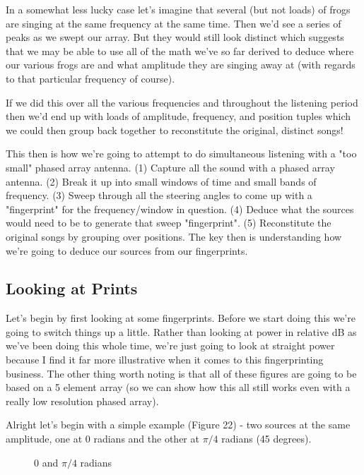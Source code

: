 \documentclass[10pt,a4paper]{article}
\begin{document}
In a somewhat less lucky case let's imagine that several (but not loads) of frogs are singing at the same frequency at the same time. Then we'd see a series of peaks as we swept our array. But they would still look distinct which suggests that we may be able to use all of the math we've so far derived to deduce where our various frogs are and what amplitude they are singing away at (with regards to that particular frequency of course). 

If we did this over all the various frequencies and throughout the listening period then we'd end up with loads of amplitude, frequency, and position tuples which we could then group back together to reconstitute the original, distinct songs! 

This then is how we're going to attempt to do simultaneous listening with a "too small" phased array antenna. (1) Capture all the sound with a phased array antenna. (2) Break it up into small windows of time and small bands of frequency. (3) Sweep through all the steering angles to come up with a "fingerprint" for the frequency/window in question. (4) Deduce what the sources would need to be to generate that sweep "fingerprint". (5) Reconstitute the original songs by grouping over positions. The key then is understanding how we're going to deduce our sources from our fingerprints.

\subsection{Looking at Prints}
Let's begin by first looking at some fingerprints. Before we start doing this we're going to switch things up a little. Rather than looking at power in relative dB as we've been doing this whole time, we're just going to look at straight power because I find it far more illustrative when it comes to this fingerprinting business. The other thing worth noting is that all of these figures are going to be based on a 5 element array (so we can show how this all still works even with a really low resolution phased array). 

Alright let's begin with a simple example (Figure 22) - two sources at the same amplitude, one at 0 radians and the other at $\pi/4$ radians (45 degrees). 

\begin{figure}[!htb]
\caption{\label{fig:my-label} 0 and $\pi/4$ radians}
\end{figure}
\end{document}

